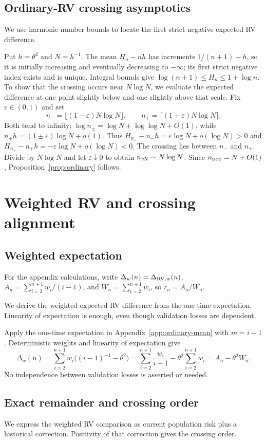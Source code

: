 \documentclass[11pt]{article}
\theoremstyle{definition}
\begin{document}
\subsection{Ordinary-RV crossing asymptotics}\label{app:ordinary-cross}
We use harmonic-number bounds to locate the first strict negative expected RV difference.

Put $h=\theta^2$ and $N=h^{-1}$. The mean $H_n-nh$ has increments $1/(n+1)-h$, so it is initially increasing and eventually decreasing to $-\infty$; its first strict negative index exists and is unique. Integral bounds give $\log(n+1)\le H_n\le1+\log n$. To show that the crossing occurs near $N\log N$, we evaluate the expected difference at one point slightly below and one slightly above that scale. Fix $\varepsilon\in(0,1)$ and set
\[
n_-=\lfloor(1-\varepsilon)N\log N\rfloor,\qquad
n_+=\lceil(1+\varepsilon)N\log N\rceil.
\]
Both tend to infinity; $\log n_\pm=\log N+\log\log N+O(1)$, while $n_\pm h=(1\pm\varepsilon)\log N+o(1)$. Thus $H_{n_-}-n_-h=\varepsilon\log N+o(\log N)>0$ and $H_{n_+}-n_+h=-\varepsilon\log N+o(\log N)<0$. The crossing lies between $n_-$ and $n_+$. Divide by $N\log N$ and let $\varepsilon\downarrow0$ to obtain $n_{\rm RV}\sim N\log N$. Since $n_{\rm pop}=N+O(1)$, Proposition~\ref{prop:ordinary} follows.

\section{Weighted RV and crossing alignment}

\subsection{Weighted expectation}\label{app:weighted-mean}
For the appendix calculations, write
$\Delta_w(n)=\Delta_{{\rm RV},w}(n)$,
$A_n=\sum_{i=2}^{n+1}w_i/(i-1)$, and
$W_n=\sum_{i=2}^{n+1}w_i$, so $r_n=A_n/W_n$.

We derive the weighted expected RV difference from the one-time expectation. Linearity of expectation is enough, even though validation losses are dependent.

Apply the one-time expectation in Appendix~\ref{app:ordinary-mean} with $m=i-1$. Deterministic weights and linearity of expectation give
\[
\Delta_w(n)=\sum_{i=2}^{n+1}w_i\bigl((i-1)^{-1}-\theta^2\bigr)
=\sum_{i=2}^{n+1}\frac{w_i}{i-1}
-\theta^2\sum_{i=2}^{n+1}w_i=A_n-\theta^2W_n.
\]
No independence between validation losses is asserted or needed.

\subsection{Exact remainder and crossing order}\label{app:remainder}
We express the weighted RV comparison as current population risk plus a historical correction. Positivity of that correction gives the crossing order.
\end{document}
